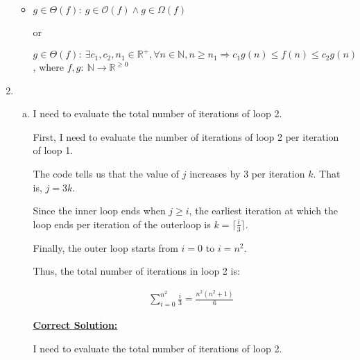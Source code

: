 \documentclass[12pt]{article}
\begin{document}
\begin{enumerate}[1.]
\begin{itemize}
        \item

        $g \in \Theta(f):\: g \in \mathcal{O}(f) \land g \in \Omega(f)$

        or

        $g \in \Theta(f):\:\exists c_1,c_2,n_1 \in \mathbb{R}^{+}, \forall n \in \mathbb{N}, n \geq n_1
        \Rightarrow c_1g(n) \leq f(n) \leq c_2g(n)$, where $f,g:\:\mathbb{N} \to \mathbb{R}^{\geq 0}$
    \end{itemize}

    \item

    \begin{enumerate}[a)]
        \item

        I need to evaluate the total number of iterations of loop 2.

        \bigskip

        First, I need to evaluate the number of iterations of loop 2 per iteration of loop 1.

        \bigskip

        The code tells us that the value of $j$ increases by 3 per iteration $k$. That is, $j = 3k$.

        \bigskip

        Since the inner loop ends when $j \geq i$, the earliest iteration at which
        the loop ends per iteration of the outerloop is $k = \lceil \frac{i}{3} \rceil$.

        \bigskip

        Finally, the outer loop starts from $i = 0$ to $i = n^2$.

        \bigskip

        Thus, the total number of iterations in loop 2 is:

        \setcounter{equation}{0}
        \begin{align}
            \sum\limits_{i=0}^{n^2} \frac{i}{3} = \frac{n^2 (n^2 + 1)}{6}
        \end{align}

        \bigskip

        \begin{mdframed}
            \underline{\textbf{Correct Solution:}}

            \bigskip

            I need to evaluate the total number of iterations of loop 2.

            \bigskip


\end{mdframed}
\end{enumerate}
\end{enumerate}
\end{document}
